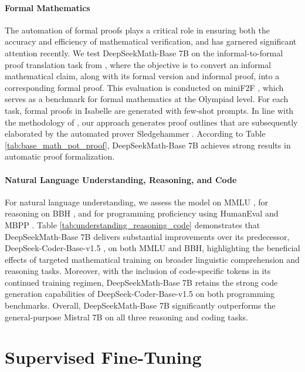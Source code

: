 \paragraph{Formal Mathematics}

The automation of formal proofs plays a critical role in ensuring both the accuracy and efficiency of mathematical verification, and has garnered significant attention recently. We test DeepSeekMath-Base 7B on the informal-to-formal proof translation task from \citep{dsp_proof}, where the objective is to convert an informal mathematical claim, along with its formal version and informal proof, into a corresponding formal proof. This evaluation is conducted on miniF2F \citep{minif2f}, which serves as a benchmark for formal mathematics at the Olympiad level. For each task, formal proofs in Isabelle are generated with few-shot prompts. In line with the methodology of \cite{dsp_proof}, our approach generates proof outlines that are subsequently elaborated by the automated prover Sledgehammer \citep{sledgehammer}. According to Table \ref{tab:base_math_pot_proof}, DeepSeekMath-Base 7B achieves strong results in automatic proof formalization.

\paragraph{Natural Language Understanding, Reasoning, and Code}

For natural language understanding, we assess the model on MMLU \citep{mmlu}, for reasoning on BBH \citep{bbh}, and for programming proficiency using HumanEval \citep{codex} and MBPP \citep{mbpp}. Table \ref{tab:understanding_reasoning_code} demonstrates that DeepSeekMath-Base 7B delivers substantial improvements over its predecessor, DeepSeek-Coder-Base-v1.5 \citep{deepseek-coder}, on both MMLU and BBH, highlighting the beneficial effects of targeted mathematical training on broader linguistic comprehension and reasoning tasks. Moreover, with the inclusion of code-specific tokens in its continued training regimen, DeepSeekMath-Base 7B retains the strong code generation capabilities of DeepSeek-Coder-Base-v1.5 on both programming benchmarks. Overall, DeepSeekMath-Base 7B significantly outperforms the general-purpose Mistral 7B \citep{mistral} on all three reasoning and coding tasks.

\section{Supervised Fine-Tuning}

